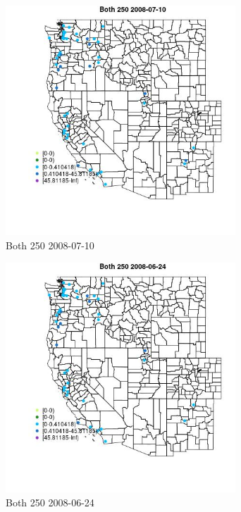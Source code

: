 \begin{figure} 
\centering  
\includegraphics[width=0.77\textwidth]{Code_Outputs/Report_ML_input_PM25_Step4_part_e_de_duplicated_aves_MapObsBoth_2502008-07-10.jpg} 
\caption{\label{fig:Report_ML_input_PM25_Step4_part_e_de_duplicated_avesMapObsBoth_2502008-07-10}Both 250 2008-07-10} 
\end{figure} 
 

\begin{figure} 
\centering  
\includegraphics[width=0.77\textwidth]{Code_Outputs/Report_ML_input_PM25_Step4_part_e_de_duplicated_aves_MapObsBoth_2502008-06-24.jpg} 
\caption{\label{fig:Report_ML_input_PM25_Step4_part_e_de_duplicated_avesMapObsBoth_2502008-06-24}Both 250 2008-06-24} 
\end{figure} 
 

